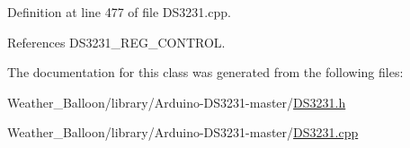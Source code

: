 Definition at line 477 of file D\+S3231.\+cpp.



References D\+S3231\+\_\+\+R\+E\+G\+\_\+\+C\+O\+N\+T\+R\+OL.



The documentation for this class was generated from the following files\+:\begin{DoxyCompactItemize}
\item 
Weather\+\_\+\+Balloon/library/\+Arduino-\/\+D\+S3231-\/master/\hyperlink{_d_s3231_8h}{D\+S3231.\+h}\item 
Weather\+\_\+\+Balloon/library/\+Arduino-\/\+D\+S3231-\/master/\hyperlink{_d_s3231_8cpp}{D\+S3231.\+cpp}\end{DoxyCompactItemize}
